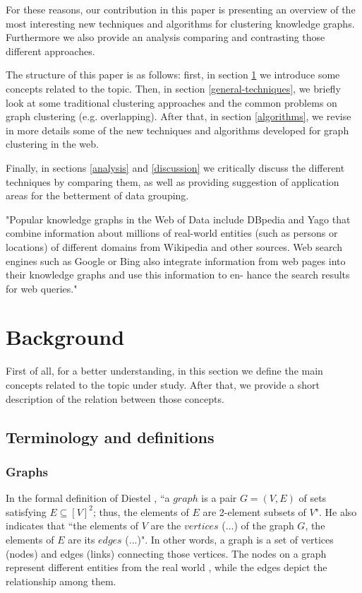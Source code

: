 \documentclass[runningheads]{llncs}
\begin{document}
For these reasons, our contribution in this paper is presenting an overview of the most interesting new techniques and algorithms for clustering knowledge graphs. Furthermore we also provide an analysis comparing and contrasting those different approaches.

The structure of this paper is as follows: first, in section \ref{background} we introduce some concepts related to the topic. Then, in section \ref{general-techniques}, we briefly look at some traditional clustering approaches and the common problems on graph clustering (e.g. overlapping). After that, in section \ref{algorithms}, we revise in more details some of the new techniques and algorithms developed for graph clustering in the web.

Finally, in sections \ref{analysis} and \ref{discussion} we critically discuss the different techniques by comparing them, as well as providing suggestion of application areas for the betterment of data grouping. 


"Popular knowledge graphs in the Web of Data include DBpedia and Yago that combine information about millions of real-world entities (such as persons or locations) of different domains from Wikipedia and other sources. Web search engines such as Google or Bing also integrate information from web pages into their knowledge graphs and use this information to en- hance the search results for web queries." \cite{Saeedi}

\section{Background} \label{background}
First of all, for a better understanding, in this section we define the main concepts related to the topic under study. After that, we provide a short description of the relation between those concepts.

\subsection{Terminology and definitions} \label{terminology}

\subsubsection{Graphs} \label{graphs}
In the formal definition of Diestel \cite{Diestel}, ``a $graph$ is a pair $G = (V, E)$ of sets satisfying $E \subseteq [V]^2$; thus, the elements of $E$ are 2-element subsets of $V$". He also indicates that ``the elements of $V$ are the $vertices$ (...) of the graph $G$, the elements of $E$ are its $edges$ (...)". In other words, a graph is a set of vertices (nodes) and edges (links) connecting those vertices. The nodes on a graph represent different entities from the real world \cite{Robinson}, while the edges depict the relationship among them.
\end{document}
